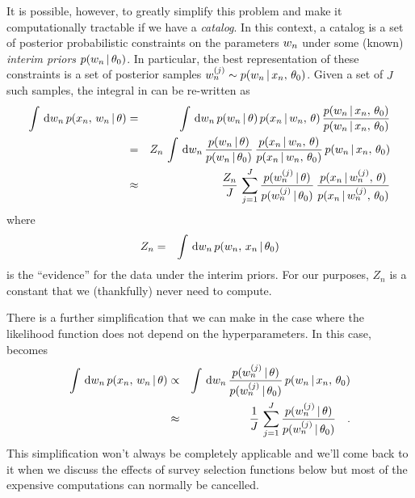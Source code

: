 \documentclass[12pt,preprint]{aastex}
\begin{document}
It is possible, however, to greatly simplify this problem and make it
computationally tractable if we have a \emph{catalog}.
In this context, a catalog is a set of posterior probabilistic constraints on
the parameters $w_n$ under some (known) \emph{interim priors}
$p(w_n\,|\,\theta_0)$.
In particular, the best representation of these constraints is a set of
posterior samples $w_n^{(j)} \sim p(w_n\,|\,x_n,\,\theta_0)$.
Given a set of $J$ such samples, the integral in  can be
re-written as
\begin{eqnarray}
\int \dd \local_n\,p(\data_n,\,\local_n\,|\,\hyper) &=&
\int \dd \local_n\,p(\local_n\,|\,\hyper)\,p(\data_n\,|\,\local_n,\,\hyper)\,
    \frac{p(\local_n\,|\,\data_n,\,\hyper_0)}
         {p(\local_n\,|\,\data_n,\,\hyper_0)} \nonumber\\
&=& Z_n\,\int \dd\local_n\,
    \frac{p(\local_n\,|\,\hyper)}{p(\local_n\,|\,\hyper_0)} \,
    \frac{p(\data_n\,|\,\local_n,\,\hyper)}{p(\data_n\,|\,\local_n,\,\hyper_0)}
    \,p(\local_n\,|\,\data_n,\,\hyper_0) \nonumber\\
&\approx& \frac{Z_n}{J} \, \sum_{j=1}^J
    \frac{p(\local_n^{(j)}\,|\,\hyper)}{p(\local_n^{(j)}\,|\,\hyper_0)} \,
    \frac{p(\data_n\,|\,\local_n^{(j)},\,\hyper)}
         {p(\data_n\,|\,\local_n^{(j)},\,\hyper_0)}
\eqlabel{full-import}
\end{eqnarray}
where
\begin{eqnarray}
Z_n &=& \int \,\mathrm{d}w_n\,p(w_n,\,x_n\,|\,\theta_0)
\end{eqnarray}
is the ``evidence'' for the data under the interim priors.
For our purposes, $Z_n$ is a constant that we (thankfully) never need to
compute.

There is a further simplification that we can make in the case where the
likelihood function does not depend on the hyperparameters.
In this case,  becomes
\begin{eqnarray}
\int \,\mathrm{d} w_n\,p(x_n,\,w_n\,|\,\theta) &\propto&
\int \,\mathrm{d}w_n\,
    \frac{p(w_n^{(j)}\,|\,\theta)}{p(w_n^{(j)}\,|\,\theta_0)} \,
    p(w_n\,|\,x_n,\,\theta_0) \nonumber\\
&\approx& \frac{1}{J} \, \sum_{j=1}^J
    \frac{p(w_n^{(j)}\,|\,\theta)}{p(w_n^{(j)}\,|\,\theta_0)} \quad.
\end{eqnarray}
This simplification won't always be completely applicable and we'll come back
to it when we discuss the effects of survey selection functions below but most
of the expensive computations can normally be cancelled.
\end{document}
